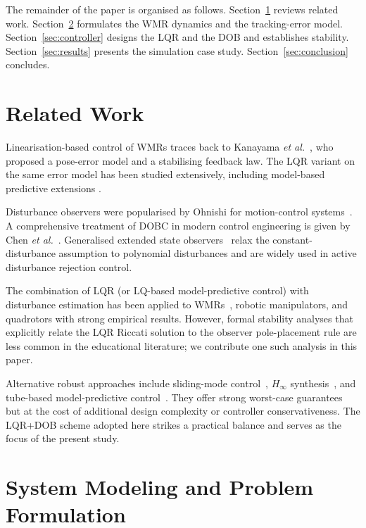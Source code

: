 \documentclass[conference]{IEEEtran}
\begin{document}
The remainder of the paper is organised as follows.
Section~\ref{sec:related} reviews related work.
Section~\ref{sec:model} formulates the WMR dynamics and the tracking-error
model. Section~\ref{sec:controller} designs the LQR and the DOB and
establishes stability. Section~\ref{sec:results} presents the simulation
case study. Section~\ref{sec:conclusion} concludes.

\section{Related Work}\label{sec:related}

Linearisation-based control of WMRs traces back to Kanayama
\textit{et al.}~\cite{kanayama1990}, who proposed a pose-error model and a
stabilising feedback law. The LQR variant on the same error model has been
studied extensively, including model-based predictive extensions
\cite{klancar2007}.

Disturbance observers were popularised by Ohnishi for motion-control
systems~\cite{ohnishi1996}. A comprehensive treatment of DOBC in modern
control engineering is given by Chen \textit{et al.}~\cite{chen2016disturbance}.
Generalised extended state observers~\cite{li2012generalized} relax the
constant-disturbance assumption to polynomial disturbances and are widely
used in active disturbance rejection control.

The combination of LQR (or LQ-based model-predictive control) with
disturbance estimation has been applied to WMRs~\cite{kayacan2015},
robotic manipulators, and quadrotors with strong empirical results. However,
formal stability analyses that explicitly relate the LQR Riccati solution
to the observer pole-placement rule are less common in the educational
literature; we contribute one such analysis in this paper.

Alternative robust approaches include sliding-mode control~\cite{utkin2009},
$H_\infty$ synthesis~\cite{zhou1996}, and tube-based model-predictive
control~\cite{mayne2005}. They offer strong worst-case guarantees but at
the cost of additional design complexity or controller conservativeness.
The LQR+DOB scheme adopted here strikes a practical balance and serves as
the focus of the present study.

\section{System Modeling and Problem Formulation}\label{sec:model}
\end{document}
